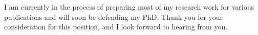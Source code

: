 \documentclass[11pt, a4paper]{awesome-cv}
\begin{document}
\begin{cvletter}
    I am currently in the process of preparing most of my research work for various publications and will soon be defending my PhD.
    Thank you for your consideration for this position, and I look forward to hearing from you.
\end{cvletter}


\makeletterclosing
\end{document}
